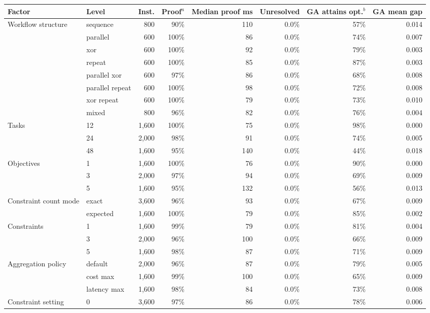 \begin{tabular}{llrrrrrr}
\toprule
Factor & Level & Inst. & Proof$^{a}$ & Median proof ms & Unresolved & GA attains opt.$^{b}$ & GA mean gap \\
\midrule
Workflow structure & sequence & 800 & 90\% & 110 & 0.0\% & 57\% & 0.014 \\
 & parallel & 600 & 100\% & 86 & 0.0\% & 74\% & 0.007 \\
 & xor & 600 & 100\% & 92 & 0.0\% & 79\% & 0.003 \\
 & repeat & 600 & 100\% & 85 & 0.0\% & 87\% & 0.003 \\
 & parallel xor & 600 & 97\% & 86 & 0.0\% & 68\% & 0.008 \\
 & parallel repeat & 600 & 100\% & 98 & 0.0\% & 72\% & 0.008 \\
 & xor repeat & 600 & 100\% & 79 & 0.0\% & 73\% & 0.010 \\
 & mixed & 800 & 96\% & 82 & 0.0\% & 76\% & 0.004 \\
\addlinespace[2pt]
Tasks & 12 & 1,600 & 100\% & 75 & 0.0\% & 98\% & 0.000 \\
 & 24 & 2,000 & 98\% & 91 & 0.0\% & 74\% & 0.005 \\
 & 48 & 1,600 & 95\% & 140 & 0.0\% & 44\% & 0.018 \\
\addlinespace[2pt]
Objectives & 1 & 1,600 & 100\% & 76 & 0.0\% & 90\% & 0.000 \\
 & 3 & 2,000 & 97\% & 94 & 0.0\% & 69\% & 0.009 \\
 & 5 & 1,600 & 95\% & 132 & 0.0\% & 56\% & 0.013 \\
\addlinespace[2pt]
Constraint count mode & exact & 3,600 & 96\% & 93 & 0.0\% & 67\% & 0.009 \\
 & expected & 1,600 & 100\% & 79 & 0.0\% & 85\% & 0.002 \\
\addlinespace[2pt]
Constraints & 1 & 1,600 & 99\% & 79 & 0.0\% & 81\% & 0.004 \\
 & 3 & 2,000 & 96\% & 100 & 0.0\% & 66\% & 0.009 \\
 & 5 & 1,600 & 98\% & 87 & 0.0\% & 71\% & 0.009 \\
\addlinespace[2pt]
Aggregation policy & default & 2,000 & 96\% & 87 & 0.0\% & 79\% & 0.005 \\
 & cost max & 1,600 & 99\% & 100 & 0.0\% & 65\% & 0.009 \\
 & latency max & 1,600 & 98\% & 84 & 0.0\% & 73\% & 0.008 \\
\addlinespace[2pt]
Constraint setting & 0 & 3,600 & 97\% & 86 & 0.0\% & 78\% & 0.006 \\

\end{tabular}
